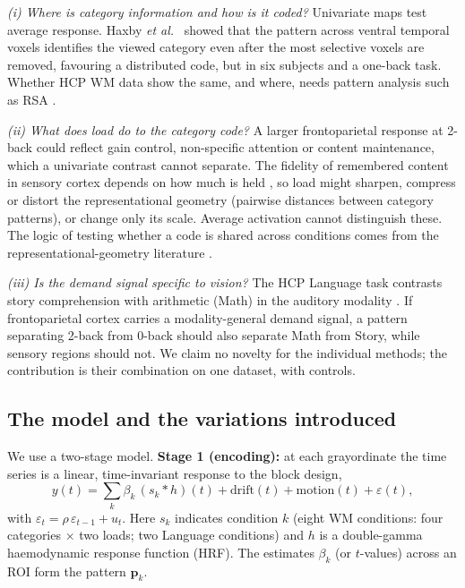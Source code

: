 \documentclass[conference]{IEEEtran}
\begin{document}
\emph{(i) Where is category information and how is it coded?} Univariate maps test average response. Haxby \emph{et al.}\ \cite{haxby2001} showed that the pattern across ventral temporal voxels identifies the viewed category even after the most selective voxels are removed, favouring a distributed code, but in six subjects and a one-back task. Whether HCP WM data show the same, and where, needs pattern analysis such as RSA \cite{kriegeskorte2008}.

\emph{(ii) What does load do to the category code?} A larger frontoparietal response at 2-back could reflect gain control, non-specific attention or content maintenance, which a univariate contrast cannot separate. The fidelity of remembered content in sensory cortex depends on how much is held \cite{emrich2013}, so load might sharpen, compress or distort the representational geometry (pairwise distances between category patterns), or change only its scale. Average activation cannot distinguish these. The logic of testing whether a code is shared across conditions comes from the representational-geometry literature \cite{kriegeskorte2013,bernardi2020}.

\emph{(iii) Is the demand signal specific to vision?} The HCP Language task contrasts story comprehension with arithmetic (Math) in the auditory modality \cite{binder2011}. If frontoparietal cortex carries a modality-general demand signal, a pattern separating 2-back from 0-back should also separate Math from Story, while sensory regions should not. We claim no novelty for the individual methods; the contribution is their combination on one dataset, with controls.

\subsection{The model and the variations introduced}
We use a two-stage model. \textbf{Stage 1 (encoding):} at each grayordinate the time series is a linear, time-invariant response to the block design,
\begin{equation}
y(t)=\sum_{k}\beta_k\,(s_k\ast h)(t)+\text{drift}(t)+\text{motion}(t)+\varepsilon(t),
\label{eq:glm}
\end{equation}
with $\varepsilon_t=\rho\,\varepsilon_{t-1}+u_t$. Here $s_k$ indicates condition $k$ (eight WM conditions: four categories $\times$ two loads; two Language conditions) and $h$ is a double-gamma haemodynamic response function (HRF). The estimates $\beta_k$ (or $t$-values) across an ROI form the pattern $\mathbf{p}_k$.
\end{document}
